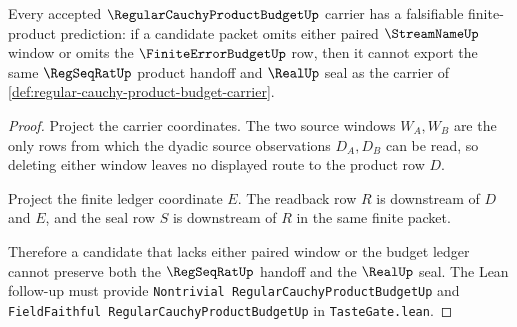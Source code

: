 \begin{theorem}
\label{thm:regular-cauchy-product-budget-falsifiable-prediction}
Every accepted $\RegularCauchyProductBudgetUp$ carrier has a falsifiable finite-product prediction: if a candidate packet omits either paired $\StreamNameUp$ window or omits the $\FiniteErrorBudgetUp$ row, then it cannot export the same $\RegSeqRatUp$ product handoff and $\RealUp$ seal as the carrier of \autoref{def:regular-cauchy-product-budget-carrier}.
\end{theorem}
\begin{proof}
Project the carrier coordinates. The two source windows $W_A,W_B$ are the only rows from which the dyadic source observations $D_A,D_B$ can be read, so deleting either window leaves no displayed route to the product row $D$.

Project the finite ledger coordinate $E$. The readback row $R$ is downstream of $D$ and $E$, and the seal row $S$ is downstream of $R$ in the same finite packet.

Therefore a candidate that lacks either paired window or the budget ledger cannot preserve both the $\RegSeqRatUp$ handoff and the $\RealUp$ seal. The Lean follow-up must provide \texttt{Nontrivial RegularCauchyProductBudgetUp} and \texttt{FieldFaithful RegularCauchyProductBudgetUp} in \texttt{TasteGate.lean}.
\end{proof}

